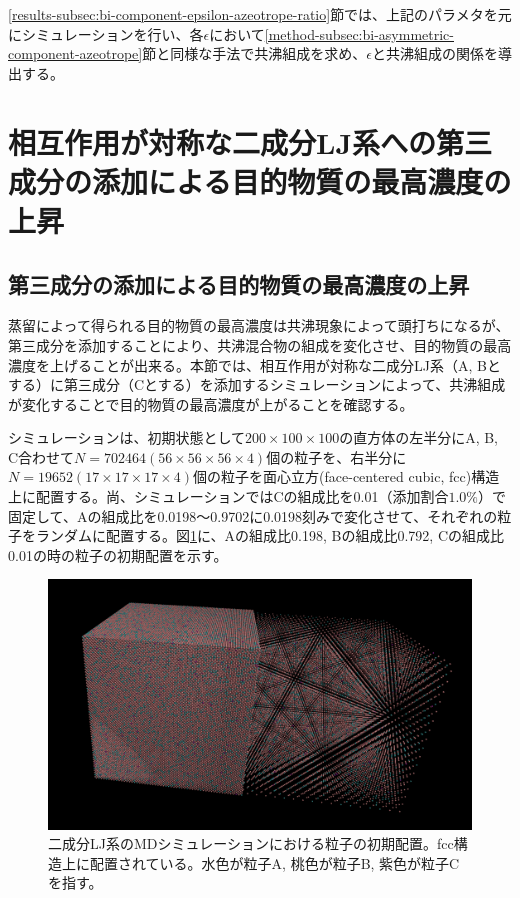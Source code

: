 \documentclass[titlepage]{jsreport}
\begin{document}
\newpage
\ref{results-subsec:bi-component-epsilon-azeotrope-ratio}節では、上記のパラメタを元にシミュレーションを行い、各$\epsilon$において\ref{method-subsec:bi-asymmetric-component-azeotrope}節と同様な手法で共沸組成を求め、$\epsilon$と共沸組成の関係を導出する。


\section{相互作用が対称な二成分LJ系への第三成分の添加による目的物質の最高濃度の上昇} \label{method-sec:bi-component-addition-of-3rd-component-highest-purity}
\subsection{第三成分の添加による目的物質の最高濃度の上昇} \label{method-subsec:bi-component-addition-of-3rd-component-highest-purity}
蒸留によって得られる目的物質の最高濃度は共沸現象によって頭打ちになるが、第三成分を添加することにより、共沸混合物の組成を変化させ、目的物質の最高濃度を上げることが出来る\cite{azeotrope-add_third_component}。本節では、相互作用が対称な二成分LJ系（A, Bとする）に第三成分（Cとする）を添加するシミュレーションによって、共沸組成が変化することで目的物質の最高濃度が上がることを確認する。

シミュレーションは、初期状態として$200×100×100$の直方体の左半分にA, B, C合わせて$N=702464(56×56×56×4)$個の粒子を、右半分に$N=19652(17×17×17×4)$個の粒子を面心立方(face-centered cubic, fcc)構造上に配置する。尚、シミュレーションではCの組成比を0.01（添加割合$1.0\%$）で固定して、Aの組成比を0.0198〜0.9702に0.0198刻みで変化させて、それぞれの粒子をランダムに配置する。図\ref{fig:lan139088-lbn556351-lcn7025-ran3891-rbn15564-rcn197-first}に、Aの組成比0.198, Bの組成比0.792, Cの組成比0.01の時の粒子の初期配置を示す。

\begin{figure}[htbp]
    \begin{center}
        \includegraphics[width=14cm]{fig/lan278176-lbn417263-lcn7025-ran7782-rbn11673-rcn197/lan139088-lbn556351-lcn7025-ran3891-rbn15564-rcn197-first.png}
    \end{center}
    \caption{二成分LJ系のMDシミュレーションにおける粒子の初期配置。fcc構造上に配置されている。水色が粒子A, 桃色が粒子B, 紫色が粒子Cを指す。}
    \label{fig:lan139088-lbn556351-lcn7025-ran3891-rbn15564-rcn197-first}
\end{figure}
\end{document}
